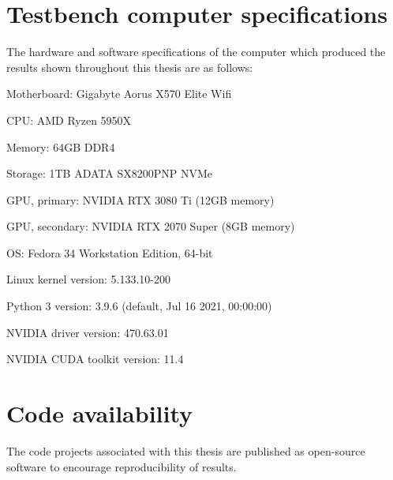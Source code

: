 \documentclass[report.tex]{subfiles}
\begin{document}
\begin{appendices}

\section{Testbench computer specifications}
\label{appendix:computerspec}

The hardware and software specifications of the computer which produced the results shown throughout this thesis are as follows:
\begin{tight_itemize}
	\item
		Motherboard: Gigabyte Aorus X570 Elite Wifi
	\item
		CPU: AMD Ryzen 5950X
	\item
		Memory: 64GB DDR4
	\item
		Storage: 1TB ADATA SX8200PNP NVMe
	\item
		GPU, primary: NVIDIA RTX 3080 Ti (12GB memory)
	\item
		GPU, secondary: NVIDIA RTX 2070 Super (8GB memory)
	\item
		OS: Fedora 34 Workstation Edition, 64-bit
	\item
		Linux kernel version: 5.133.10-200
	\item
		Python 3 version: 3.9.6 (default, Jul 16 2021, 00:00:00)
	\item
		NVIDIA driver version: 470.63.01
	\item
		NVIDIA CUDA toolkit version: 11.4
\end{tight_itemize}

\newpagefill

\section{Code availability}
\label{appendix:codeavail}

The code projects associated with this thesis are published as open-source software to encourage reproducibility of results.


\end{appendices}
\end{document}
